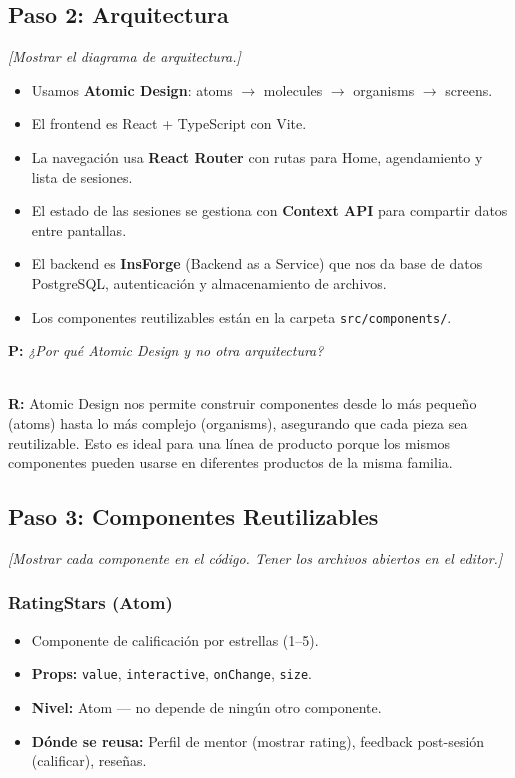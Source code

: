 \documentclass[12pt, a4paper]{article}
\newcommand{\nota}[1]{%
  \textcolor{upds-gold}{\small\textit{[#1]}}%
}
\newcommand{\pregunta}[1]{%
  \textbf{\textcolor{upds-blue}{P:}} \textit{#1}%
}
\newcommand{\respuesta}[1]{%
  \\[2pt]\textbf{\textcolor{upds-blue}{R:}} #1%
}
\begin{document}
\subsection{Paso 2: Arquitectura}
\nota{Mostrar el diagrama de arquitectura.}

\begin{itemize}
  \item Usamos \textbf{Atomic Design}: atoms $\to$ molecules $\to$ organisms $\to$ screens.
  \item El frontend es React + TypeScript con Vite.
  \item La navegación usa \textbf{React Router} con rutas para Home, agendamiento y lista de sesiones.
  \item El estado de las sesiones se gestiona con \textbf{Context API} para compartir datos entre pantallas.
  \item El backend es \textbf{InsForge} (Backend as a Service) que nos da base de datos PostgreSQL, autenticación y almacenamiento de archivos.
  \item Los componentes reutilizables están en la carpeta \texttt{src/components/}.
\end{itemize}

\pregunta{¿Por qué Atomic Design y no otra arquitectura?}
\respuesta{Atomic Design nos permite construir componentes desde lo más pequeño (atoms) hasta lo más complejo (organisms), asegurando que cada pieza sea reutilizable. Esto es ideal para una línea de producto porque los mismos componentes pueden usarse en diferentes productos de la misma familia.}

\subsection{Paso 3: Componentes Reutilizables}
\nota{Mostrar cada componente en el código. Tener los archivos abiertos en el editor.}

\subsubsection{RatingStars (Atom)}
\begin{itemize}
  \item Componente de calificación por estrellas (1--5).
  \item \textbf{Props:} \texttt{value}, \texttt{interactive}, \texttt{onChange}, \texttt{size}.
  \item \textbf{Nivel:} Atom --- no depende de ningún otro componente.
  \item \textbf{Dónde se reusa:} Perfil de mentor (mostrar rating), feedback post-sesión (calificar), reseñas.
\end{itemize}
\end{document}
